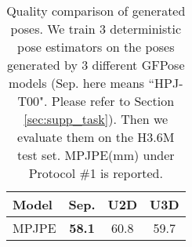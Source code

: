 \documentclass[10pt,twocolumn,letterpaper]{article}
\begin{document}
\begin{table}
    \caption{Denoising results on H3.6M dataset. We report MPJPE (mm) under Protocol \#2. ``Sep." here indicates model ``HPJ-T00". (Please refer to Section \ref{sec:supp_task}) ``Base" represents the MPJPE(mm) of noisy data.  and  denote Gaussian and uniform noise, respectively.  denotes the start time of RSDE.}
    \label{table:supp_denoising}
\end{table}


\begin{table}
\centering
    \small
\setlength{\tabcolsep}{0.4cm}
        \begin{tabular}{l c c c}
            \toprule
            Model & Sep. & U2D & U3D \\
            \midrule
            MPJPE & \textbf{58.1} & 60.8 & 59.7 \\
            \bottomrule
        \end{tabular}
\caption{Quality comparison of generated poses. We train 3 deterministic pose estimators on the poses generated by 3 different GFPose models (Sep. here means ``HPJ-T00". Please refer to Section \ref{sec:supp_task}). Then we evaluate them on the H3.6M test set. MPJPE(mm) under Protocol \#1 is reported.}
    \label{table:supp_generation}
\end{table}
\end{document}
